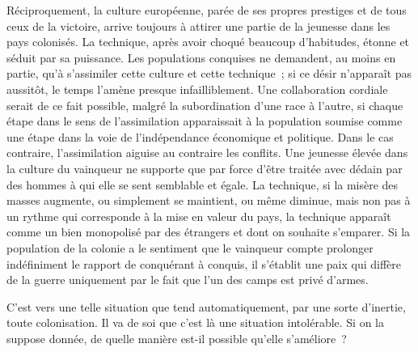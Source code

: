 \documentclass[french,twoside]{book} %
\begin{document}
Réciproquement, la culture européenne, parée de ses propres prestiges et de tous ceux de la victoire, arrive toujours à attirer une partie de la jeunesse dans les pays colonisés. La technique, après avoir choqué beaucoup d'habi­tudes, étonne et séduit par sa puissance. Les populations conquises ne deman­dent, au moins en partie, qu'à s'assimiler cette culture et cette technique ; si ce désir n'apparaît pas aussitôt, le temps l'amène presque infailliblement. Une collaboration cordiale serait de ce fait possible, malgré la subordination d'une race à l'autre, si chaque étape dans le sens de l'assimilation apparaissait à la population soumise comme une étape dans la voie de l'indépendance écono­mique et politique. Dans le cas contraire, l'assimilation aiguise au contraire les conflits. Une jeunesse élevée dans la culture du vainqueur ne supporte que par force d'être traitée avec dédain par des hommes à qui elle se sent semblable et égale. La technique, si la misère des masses augmente, ou simplement se maintient, ou même diminue, mais non pas à un rythme qui corresponde à la mise en valeur du pays, la technique apparaît comme un bien monopolisé par des étrangers et dont on souhaite s'emparer. Si la population de la colonie a le sentiment que le vainqueur compte prolonger indéfiniment le rapport de conquérant à conquis, il s'établit une paix qui diffère de la guerre uniquement par le fait que l'un des camps est privé d'armes.\par
\par
C'est vers une telle situation que tend automatiquement, par une sorte d'inertie, toute colonisation. Il va de soi que c'est là une situation intolérable. Si on la suppose donnée, de quelle manière est-il possible qu'elle s'améliore ?\par
\end{document}
